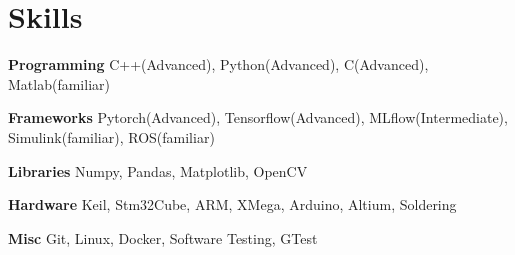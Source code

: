 
\section{Skills}
  \vspace{2pt}
  \resumeSubHeadingListStart
    \small{\item{

    \textbf{\color{MidnightBlue}Programming}{ C++(Advanced), Python(Advanced), C(Advanced), Matlab(familiar)} \\ \vspace{3pt} %

    \textbf{\color{MidnightBlue}Frameworks}{ Pytorch(Advanced), Tensorflow(Advanced), MLflow(Intermediate)}, Simulink(familiar), ROS(familiar) \\ \vspace{3pt}

    \textbf{\color{MidnightBlue}Libraries}{ Numpy, Pandas, Matplotlib, OpenCV} \\ \vspace{3pt} %

    \textbf{\color{MidnightBlue}Hardware}{ Keil, Stm32Cube, ARM, XMega, Arduino, Altium, Soldering} \\ \vspace{3pt}


    \textbf{\color{MidnightBlue}Misc}{ Git, Linux, Docker, Software Testing, GTest} \\ \vspace{3pt} %
            
    }}
  \resumeSubHeadingListEnd
